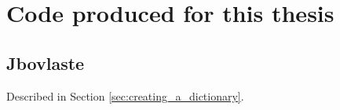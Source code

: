 \chapter{Code produced for this thesis}

\section{Jbovlaste}
\label{appendix:jbovlaste-annex}

Described in Section \ref{sec:creating_a_dictionary}.


